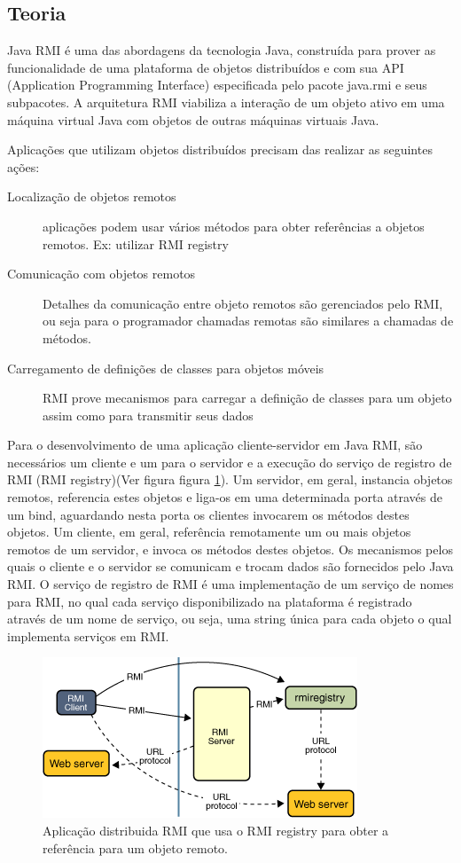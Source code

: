 \documentclass[10pt,a4paper]{article}
\begin{document}
\subsection{Teoria}
Java RMI é uma das abordagens da tecnologia Java, construída para prover as
funcionalidade de uma plataforma de objetos distribuídos e com sua API (Application
Programming Interface) especificada pelo pacote java.rmi e seus subpacotes. A
arquitetura RMI viabiliza a interação de um objeto ativo em uma máquina virtual Java com
objetos de outras máquinas virtuais Java.

Aplicações que utilizam objetos distribuídos precisam das realizar as seguintes ações:
\begin{description}
\item[Localização de objetos remotos] aplicações podem usar vários
  métodos para obter referências a objetos remotos. Ex: utilizar  RMI registry
\item [Comunicação com objetos remotos] Detalhes da comunicação entre
  objeto remotos são gerenciados pelo RMI, ou seja para o programador
  chamadas remotas são similares a chamadas de métodos.
\item [Carregamento de definições de classes para objetos móveis]
  RMI prove mecanismos para carregar a definição de classes para um
  objeto assim como para transmitir seus dados
\end{description}

Para o desenvolvimento de uma aplicação cliente-servidor em Java RMI, são
necessários um cliente e um para o servidor e a
execução do serviço de registro de RMI (RMI registry)(Ver figura
figura \ref{f1}). Um servidor, em geral, instancia
objetos remotos, referencia estes objetos e liga-os em uma determinada porta através de
um bind, aguardando nesta porta os clientes invocarem os métodos destes objetos. Um
cliente, em geral, referência remotamente um ou mais objetos remotos de um servidor, e
invoca os métodos destes objetos. Os mecanismos pelos quais o cliente e o servidor se
comunicam e trocam dados são fornecidos pelo Java RMI. O serviço de registro de RMI é
uma implementação de um serviço de nomes para RMI, no qual cada serviço
disponibilizado na plataforma é registrado através de um nome de serviço, ou seja, uma
string única para cada objeto o qual implementa serviços em RMI.

\begin{figure}[h!]
\begin{center}
\includegraphics[scale=0.7]{rmi-img.png}
\caption{Aplicação distribuida RMI que usa o RMI registry para obter a
  referência para um objeto remoto.}
\label{f1}
\end{center}
\end{figure}
\end{document}
